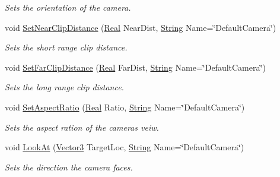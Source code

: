 \begin{DoxyCompactItemize}
\begin{DoxyCompactList}\small\item\em Sets the orientation of the camera. \item\end{DoxyCompactList}\item 
void \hyperlink{classphys_1_1CameraManager_ad639c275a2bb1c6c05a8800f8e8412c6}{SetNearClipDistance} (\hyperlink{namespacephys_af7eb897198d265b8e868f45240230d5f}{Real} NearDist, \hyperlink{namespacephys_aa03900411993de7fbfec4789bc1d392e}{String} Name=\char`\"{}DefaultCamera\char`\"{})
\begin{DoxyCompactList}\small\item\em Sets the short range clip distance. \item\end{DoxyCompactList}\item 
void \hyperlink{classphys_1_1CameraManager_a809e4e31a9ad42afd620e95508ad78d7}{SetFarClipDistance} (\hyperlink{namespacephys_af7eb897198d265b8e868f45240230d5f}{Real} FarDist, \hyperlink{namespacephys_aa03900411993de7fbfec4789bc1d392e}{String} Name=\char`\"{}DefaultCamera\char`\"{})
\begin{DoxyCompactList}\small\item\em Sets the long range clip distance. \item\end{DoxyCompactList}\item 
void \hyperlink{classphys_1_1CameraManager_af16862039fffd900b9c7acc20527cac8}{SetAspectRatio} (\hyperlink{namespacephys_af7eb897198d265b8e868f45240230d5f}{Real} Ratio, \hyperlink{namespacephys_aa03900411993de7fbfec4789bc1d392e}{String} Name=\char`\"{}DefaultCamera\char`\"{})
\begin{DoxyCompactList}\small\item\em Sets the aspect ration of the cameras veiw. \item\end{DoxyCompactList}\item 
void \hyperlink{classphys_1_1CameraManager_a885a499a53c3543b6bf429583a2cb54c}{LookAt} (\hyperlink{classphys_1_1Vector3}{Vector3} TargetLoc, \hyperlink{namespacephys_aa03900411993de7fbfec4789bc1d392e}{String} Name=\char`\"{}DefaultCamera\char`\"{})
\begin{DoxyCompactList}\small\item\em Sets the direction the camera faces. \item\end{DoxyCompactList}\item 

\end{DoxyCompactItemize}
